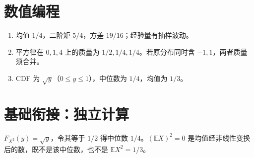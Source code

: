 \section*{数值编程}
\begin{enumerate}[leftmargin=*]
  \item 均值 $1/4$，二阶矩 $5/4$，方差 $19/16$；经验量有抽样波动。
  \item 平方律在 $0,1,4$ 上的质量为 $1/2,1/4,1/4$。若原分布同时含 $-1,1$，两者质量须合并。
  \item CDF 为 $\sqrt y$（$0\leq y\leq1$），中位数为 $1/4$，均值为 $1/3$。
\end{enumerate}

\section*{基础衔接：独立计算}
$F_{X^2}(y)=\sqrt y$，令其等于 $1/2$ 得中位数 $1/4$。$(\mathbb EX)^2=0$ 是均值经非线性变换后的数，既不是该中位数，也不是 $\mathbb EX^2=1/3$。

